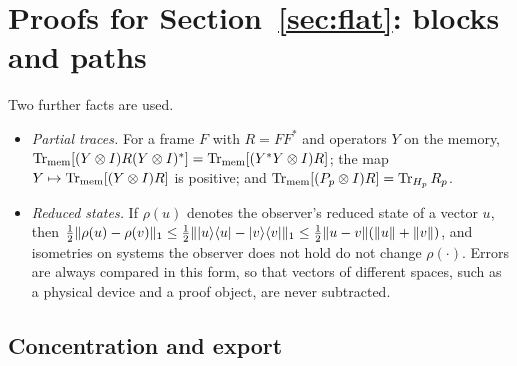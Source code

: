 \section{Proofs for Section~\ref{sec:flat}: blocks and paths}\label{app:frames}

Two further facts are used.
\begin{itemize}[leftmargin=2.8em]
\item[(F3)] \emph{Partial traces.} For a frame $F$ with $R=FF^*$ and operators $Y$ on the memory, $\operatorname{Tr}_{\rm mem}[(Y\otimes I)R(Y\otimes I)^*]=\operatorname{Tr}_{\rm mem}[(Y^*Y\otimes I)R]$;
the map $Y\mapsto\operatorname{Tr}_{\rm mem}[(Y\otimes I)R]$ is positive; and $\operatorname{Tr}_{\rm mem}[(P_p\otimes I)R]=\operatorname{Tr}_{H_p}R_p$.
\item[(F4)] \emph{Reduced states.} If $\rho(u)$ denotes the observer's reduced state of a vector $u$, then
$\frac12\lVert \rho(u)-\rho(v)\rVert_1\le\frac12\lVert \lvert u\rangle\langle u\rvert-\lvert v\rangle\langle v\rvert\rVert_1\le\frac12\lVert u-v\rVert(\lVert u\rVert+\lVert v\rVert)$, and isometries on systems the observer does not hold
do not change $\rho(\cdot)$. Errors are always compared in this form, so that vectors of different spaces, such as a physical device and a proof object, are
never subtracted.
\end{itemize}

\subsection{Concentration and export}

